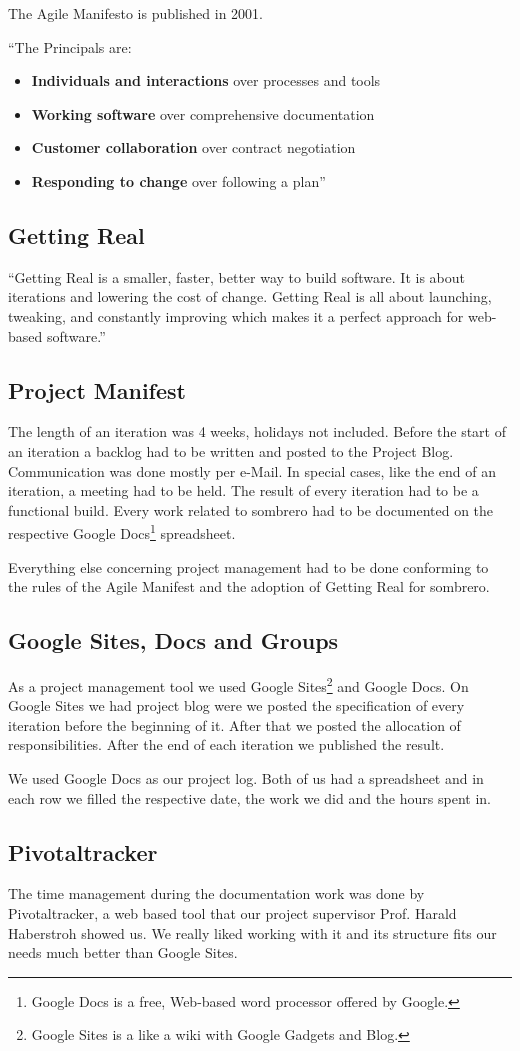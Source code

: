  The Agile Manifesto is published in 2001.

 ``The Principals are:
  \begin{itemize}
    \item \textbf{Individuals and interactions} over processes and tools
    \item \textbf{Working software} over comprehensive documentation
    \item \textbf{Customer collaboration} over contract negotiation
    \item \textbf{Responding to change} over following a plan''\cite{agilemanifesto.org}
  \end{itemize}

\subsection{Getting Real}
    ``Getting Real is a smaller, faster, better way to build software. It is about iterations and lowering the cost of change. Getting Real is all about launching, tweaking, and constantly improving which makes it a perfect approach for web-based software.''\cite{37signals:10}

\subsection{Project Manifest}
    The length of an iteration was 4 weeks, holidays not included. Before the start of an iteration a backlog had to be written and posted to the Project Blog. Communication was done mostly per e-Mail. In special cases, like the end of an iteration, a meeting had to be held. The result of every iteration had to be a functional build. Every work related to sombrero had to be documented on the respective Google Docs\footnote[1]{Google Docs is a free, Web-based word processor offered by Google.} spreadsheet.

    Everything else concerning project management had to be done conforming to the rules of the Agile Manifest and the adoption of Getting Real for sombrero.

\subsection{Google Sites, Docs and Groups}
    As a project management tool we used Google Sites\footnote[2]{Google Sites is a like a wiki with Google Gadgets and Blog.} and Google Docs. On Google Sites we had project blog were we posted the specification of every iteration before the beginning of it. After that we posted the allocation of responsibilities. After the end of each iteration we published the result.

    We used Google Docs as our project log. Both of us had a spreadsheet and in each row we filled the respective date, the work we did and the hours spent in.
\subsection{Pivotaltracker}
    The time management during the documentation work was done by Pivotaltracker, a web based tool that our project supervisor Prof. Harald Haberstroh showed us. We really liked working with it and its structure fits our needs much better than Google Sites. 